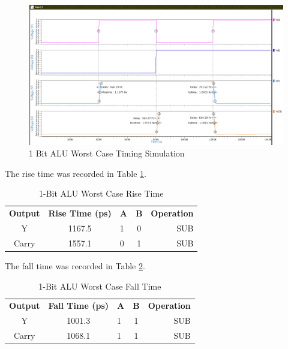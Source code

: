 \documentclass[11pt]{article}
\begin{document}
			\begin{figure}[H]
				\centering
				\includegraphics[width=1\linewidth]{"Pictures/ALU_1Bit Timing"}
				\caption{1 Bit ALU Worst Case Timing Simulation}
				\label{fig:alu1bit-timing}
			\end{figure}
		
			The rise time was recorded in Table \ref{tab:ALU-1-Bit-Risetime}.
			
			\begin{table}[H]
				\centering
				\caption{1-Bit ALU Worst Case Rise Time}
				\label{tab:ALU-1-Bit-Risetime}
				\begin{tabular}{|cclcr|}
					\hline
					\textbf{Output} & \textbf{Rise Time (ps)} & \textbf{A} & \textbf{B} & \textbf{Operation} \\
					Y               & 1167.5                  & 1          & 0          & SUB                \\
					Carry           & 1557.1                  & 0          & 1          & SUB                \\
					         \hline
				\end{tabular}
			\end{table}
		
			The fall time was recorded in Table \ref{tab:ALU-1-Bit-Falltime}.
		
			\begin{table}[H]
				\centering
				\caption{1-Bit ALU Worst Case Fall Time}
				\label{tab:ALU-1-Bit-Falltime}
				\begin{tabular}{|cclcr|}
					\hline
					\textbf{Output} & \textbf{Fall Time (ps)} & \textbf{A} & \textbf{B} & \textbf{Operation} \\
					Y               & 1001.3                  & 1          & 1          & SUB                \\
					Carry           & 1068.1                  & 1          & 1          & SUB                \\
					\hline
				\end{tabular}
			\end{table}
		
\end{document}
